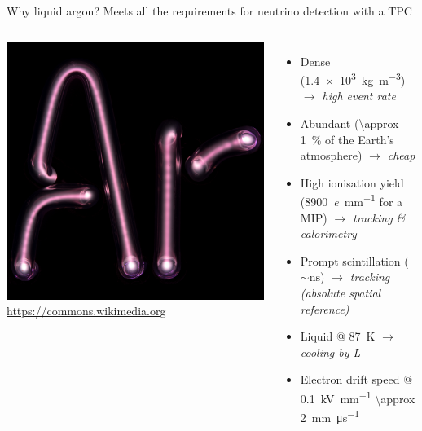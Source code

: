 \documentclass[]{beamer}
\newcommand*{\emphcoltitle}{blue}
\begin{document}
\begin{frame}{Why liquid argon?}{\color{\emphcoltitle} Meets all the requirements for neutrino detection with a TPC}
	\begin{columns}[c]
		\centering
		\includegraphics[width=\textwidth]{defence/ArTube}\\
		{\tiny\url{https://commons.wikimedia.org}}
		\begin{itemize}
			\item Dense (\SI{1.4e3}{\kilo\gram\per\cubic\metre}) \emph{$\rightarrow$ high event rate}
			\item Abundant (\SI{\approx 1}{\percent} of the Earth's atmosphere) \emph{$\rightarrow$ cheap}
			\item High ionisation yield (\SI{8900}{\elementarycharge\per\milli\metre} for a MIP) \emph{$\rightarrow$ tracking \& calorimetry}
			\item Prompt scintillation ($\sim \si{\nano\second}$) \emph{$\rightarrow$ tracking (absolute spatial reference)}
			\item Liquid @ \SI{87}{\kelvin} \emph{$\rightarrow$ cooling by L}
			\item Electron drift speed @ \SI{0.1}{\kilo\volt\per\milli\meter} \SI{\approx 2}{\milli\meter\per\micro\second}
		\end{itemize}
	\end{columns}
\end{frame}
\end{document}
